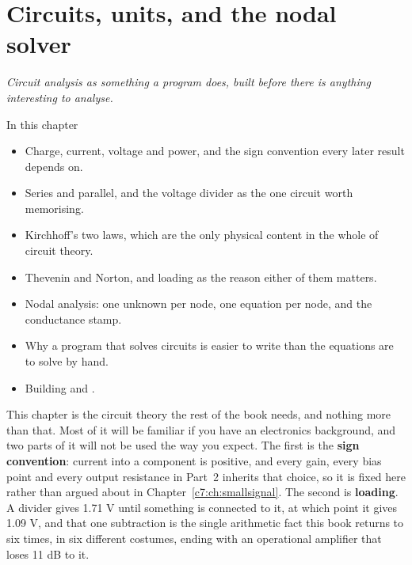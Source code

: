 
\chapter{Circuits, units, and the nodal solver}
\label{c1:ch:circuits}

{\large\itshape Circuit analysis as something a program does, built before there is anything
interesting to analyse.\par}

\begin{chapterbox}{In this chapter}
\begin{itemize}
  \item Charge, current, voltage and power, and the sign convention every later result depends on.
  \item Series and parallel, and the voltage divider as the one circuit worth memorising.
  \item Kirchhoff's two laws, which are the only physical content in the whole of circuit theory.
  \item Thevenin and Norton, and loading as the reason either of them matters.
  \item Nodal analysis: one unknown per node, one equation per node, and the conductance stamp.
  \item Why a program that solves circuits is easier to write than the equations are to solve by
    hand.
  \item Building  and .
\end{itemize}
\end{chapterbox}

This chapter is the circuit theory the rest of the book needs, and nothing more than that. Most of
it will be familiar if you have an electronics background, and two parts of it will not be used the
way you expect. The first is the \textbf{sign convention}: current into a component is positive,
and every gain, every bias point and every output resistance in Part~2 inherits that choice, so it
is fixed here rather than argued about in Chapter~\ref{c7:ch:smallsignal}. The second is
\textbf{loading}. A divider gives 1.71 V until something is connected to it, at which point it
gives 1.09 V, and that one subtraction is the single arithmetic fact this book returns to six
times, in six different costumes, ending with an operational amplifier that loses 11 dB to it.

